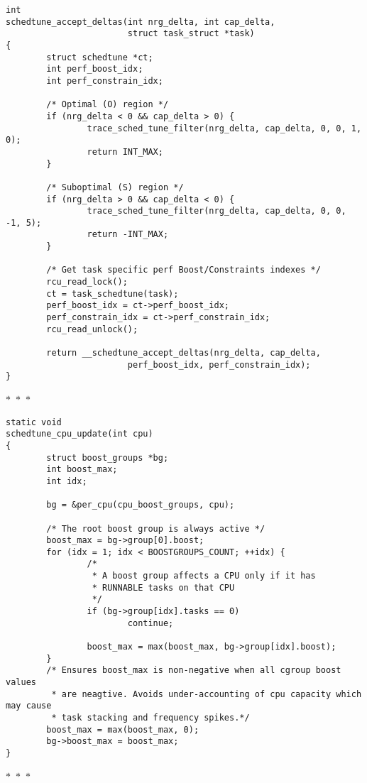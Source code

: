 \documentclass{article}
\newcommand{\divider}{{\begin{center}
  $\ast$~$\ast$~$\ast$
\end{center}}}
\begin{document}
\begin{verbatim}
int
schedtune_accept_deltas(int nrg_delta, int cap_delta,
                        struct task_struct *task)
{
        struct schedtune *ct;
        int perf_boost_idx;
        int perf_constrain_idx;

        /* Optimal (O) region */
        if (nrg_delta < 0 && cap_delta > 0) {
                trace_sched_tune_filter(nrg_delta, cap_delta, 0, 0, 1, 0);
                return INT_MAX;
        }

        /* Suboptimal (S) region */
        if (nrg_delta > 0 && cap_delta < 0) {
                trace_sched_tune_filter(nrg_delta, cap_delta, 0, 0, -1, 5);
                return -INT_MAX;
        }

        /* Get task specific perf Boost/Constraints indexes */
        rcu_read_lock();
        ct = task_schedtune(task);
        perf_boost_idx = ct->perf_boost_idx;
        perf_constrain_idx = ct->perf_constrain_idx;
        rcu_read_unlock();

        return __schedtune_accept_deltas(nrg_delta, cap_delta,
                        perf_boost_idx, perf_constrain_idx);
}
\end{verbatim}
\divider
\begin{verbatim}
static void
schedtune_cpu_update(int cpu)
{
        struct boost_groups *bg;
        int boost_max;
        int idx;

        bg = &per_cpu(cpu_boost_groups, cpu);

        /* The root boost group is always active */
        boost_max = bg->group[0].boost;
        for (idx = 1; idx < BOOSTGROUPS_COUNT; ++idx) {
                /*
                 * A boost group affects a CPU only if it has
                 * RUNNABLE tasks on that CPU
                 */
                if (bg->group[idx].tasks == 0)
                        continue;

                boost_max = max(boost_max, bg->group[idx].boost);
        }
        /* Ensures boost_max is non-negative when all cgroup boost values
         * are neagtive. Avoids under-accounting of cpu capacity which may cause
         * task stacking and frequency spikes.*/
        boost_max = max(boost_max, 0);
        bg->boost_max = boost_max;
}
\end{verbatim}
\divider
\end{document}
